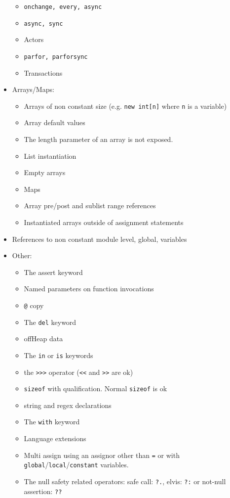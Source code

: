 \documentclass[conc-doc]{subfiles}
\begin{document}
\begin{itemize}
\begin{itemize}
		\item \lstinline{onchange, every, async}
		\item \lstinline{async, sync}
		\item Actors
		\item \lstinline{parfor, parforsync}
		\item Transactions
	\end{itemize}
	\item Arrays/Maps:
	\begin{itemize}
		\item Arrays of non constant size (e.g. \lstinline{new int[n]} where \lstinline{n} is a variable)
		\item Array default values
		\item The length parameter of an array is not exposed.
		\item List instantiation
		\item Empty arrays
		\item Maps
		\item Array pre/post and sublist range references
		\item Instantiated arrays outside of assignment statements
	\end{itemize}
	\item References to non constant module level, global, variables
	\item Other:
	\begin{itemize}
		\item The assert keyword
		\item Named parameters on function invocations
		\item \lstinline{@} copy
		\item The \lstinline{del} keyword
		\item offHeap data
		\item The \lstinline{in} or \lstinline{is} keywords
		\item the \lstinline{>>>} operator (\lstinline{<<} and \lstinline{>>} are ok)
		\item \lstinline{sizeof} with qualification. Normal \lstinline{sizeof} is ok
		\item string and regex declarations
		\item The \lstinline{with} keyword
		\item Language extensions
		\item Multi assign using an assignor other than \lstinline{=} or with \lstinline{global}/\lstinline{local}/\lstinline{constant} variables.
		\item The null safety related operators: safe call: \lstinline{?.}, elvis: \lstinline{?:} or not-null assertion: \lstinline{??}
	\end{itemize}
\end{itemize}
\end{document}
